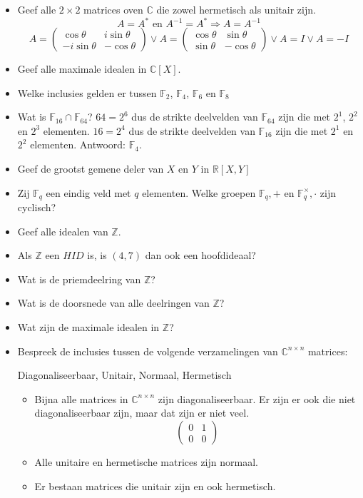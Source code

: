 \documentclass[main.tex]{subfiles}
\begin{document}
\begin{itemize}
\item Geef alle $2\times 2$ matrices oven $\mathbb{C}$ die zowel hermetisch als unitair zijn.
\[ A = A^{*} \text{ en } A^{-1}=A^{*} \Rightarrow A=A^{-1}\]
\[ A = 
\begin{pmatrix}
  \cos\theta & i\sin\theta\\
  -i\sin\theta & -\cos\theta
\end{pmatrix}
\vee 
A =
\begin{pmatrix}
  \cos\theta & \sin\theta\\
  \sin\theta & -\cos\theta
\end{pmatrix}
\vee 
A = I
\vee 
A = -I
\]
\item Geef alle maximale idealen in $\mathbb{C}[X]$.
\item Welke inclusies gelden er tussen $\mathbb{F}_{2}$, $\mathbb{F}_{4}$, $\mathbb{F}_{6}$ en $\mathbb{F}_{8}$
\item Wat is $\mathbb{F}_{16}\cap \mathbb{F}_{64}$?
$64=2^{6}$ dus de strikte deelvelden van $\mathbb{F}_{64}$ zijn die met $2^{1}$, $2^{2}$ en $2^{3}$ elementen.
$16=2^{4}$ dus de strikte deelvelden van $\mathbb{F}_{16}$ zijn die met $2^{1}$ en $2^{2}$ elementen.
Antwoord: $\mathbb{F}_{4}$.
\item Geef de grootst gemene deler van $X$ en $Y$ in $\mathbb{R}[X,Y]$
\item Zij $\mathbb{F}_{q}$ een eindig veld met $q$ elementen.
  Welke groepen $\mathbb{F}_{q},+$ en $\mathbb{F}_{q}^{\times},\cdot$ zijn cyclisch?
\item Geef alle idealen van $\mathbb{Z}$.
\item Als $\mathbb{Z}$ een $HID$ is, is $(4,7)$ dan ook een hoofdideaal?
\item Wat is de priemdeelring van $\mathbb{Z}$?
\item Wat is de doorsnede van alle deelringen van $\mathbb{Z}$?
\item Wat zijn de maximale idealen in $\mathbb{Z}$?
\item Bespreek de inclusies tussen de volgende verzamelingen van $\mathbb{C}^{n \times n}$ matrices:
  \begin{center}
    Diagonaliseerbaar, Unitair, Normaal, Hermetisch
  \end{center}
  \begin{itemize}
  \item 
    Bijna alle matrices in $\mathbb{C}^{n\times n}$ zijn diagonaliseerbaar.
    Er zijn er ook die niet diagonaliseerbaar zijn, maar dat zijn er niet veel.
    \[
    \begin{pmatrix}
      0 & 1\\
      0 & 0
    \end{pmatrix}
    \]
  \item Alle unitaire en hermetische matrices zijn normaal.
  \item Er bestaan matrices die unitair zijn en ook hermetisch. 
  \end{itemize}
\end{itemize}
\end{document}

